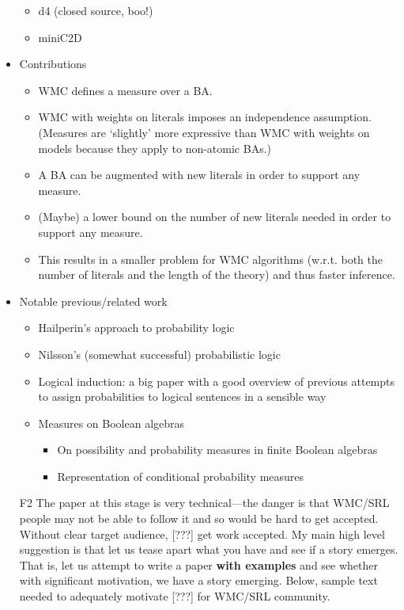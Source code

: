\documentclass{article}
\theoremstyle{definition}
\theoremstyle{remark}
\begin{document}
\begin{itemize}
\begin{itemize}
  \item d4 \cite{DBLP:conf/ijcai/LagniezM17} (closed source, boo!)
  \item miniC2D  \cite{DBLP:conf/ijcai/OztokD15}
  \end{itemize}
\item Contributions
  \begin{itemize}
  \item WMC defines a measure over a BA.
  \item WMC with weights on literals imposes an independence assumption.
    (Measures are `slightly' more expressive than WMC with weights on models
    because they apply to non-atomic BAs.)
  \item A BA can be augmented with new literals in order to support any measure.
  \item (Maybe) a lower bound on the number of new literals needed in order to
    support any measure.
  \item This results in a smaller problem for WMC algorithms (w.r.t. both the
    number of literals and the length of the theory) and thus faster inference.
  \end{itemize}
\item Notable previous/related work
  \begin{itemize}
  \item Hailperin's approach to probability logic
    \cite{DBLP:journals/ndjfl/Hailperin84}
  \item Nilsson's (somewhat successful) probabilistic logic
    \cite{DBLP:journals/ai/Nilsson86,DBLP:journals/ai/Nilsson93}
  \item Logical induction: a big paper with a good overview of previous attempts
    to assign probabilities to logical sentences in a sensible way
    \cite{DBLP:journals/eccc/GarrabrantBCST16}
  \item Measures on Boolean algebras
    \begin{itemize}
    \item On possibility and probability measures in finite Boolean algebras
      \cite{DBLP:journals/soco/CastineiraCT02}
    \item Representation of conditional probability measures
      \cite{krauss1968representation}
    \end{itemize}
  \end{itemize}
\item[F2] The paper at this stage is very technical---the danger is that WMC/SRL
  people may not be able to follow it and so would be hard to get accepted.
  Without clear target audience, [???] get work accepted. My main high level
  suggestion is that let us tease apart what you have and see if a story
  emerges. That is, let us attempt to write a paper {\bf with examples} and
  see whether with significant motivation, we have a story emerging. Below,
  sample text needed to adequately motivate [???] for WMC/SRL community.
\end{itemize}
\end{document}

